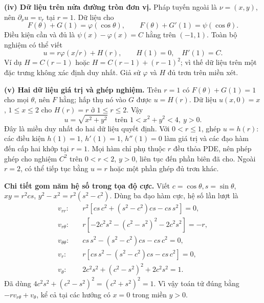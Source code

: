 \textbf{(iv) Dữ liệu trên nửa đường tròn đơn vị.} Pháp tuyến ngoài là $\nu=(x,y)$, nên $\partial_\nu u=v_r$ tại $r=1$. Dữ liệu cho
\[F(\theta)+G(1)=\varphi(\cos\theta),\qquad F(\theta)+G'(1)=\psi(\cos\theta).\]
Điều kiện cần và đủ là $\psi(x)-\varphi(x)=C$ hằng trên $(-1,1)$. Toàn bộ nghiệm có thể viết
\[u=r\varphi(x/r)+H(r),\qquad H(1)=0,\quad H'(1)=C.\]
Ví dụ $H=C(r-1)$ hoặc $H=C(r-1)+(r-1)^2$; vì thế dữ liệu trên một đặc trưng không xác định duy nhất. Giả sử $\varphi$ và $H$ đủ trơn trên miền xét.

\textbf{(v) Hai dữ liệu giá trị và ghép nghiệm.} Trên $r=1$ có $F(\theta)+G(1)=1$ cho mọi $\theta$, nên $F$ hằng; hấp thụ nó vào $G$ được $u=H(r)$. Dữ liệu $u(x,0)=x$, $1\le x\le2$ cho $H(r)=r$ ở $1\le r\le2$. Vậy
\[\boxed{u=\sqrt{x^2+y^2}\quad\text{trên }1<x^2+y^2<4,\ y>0.}\]
Đây là miền duy nhất do hai dữ liệu quyết định. Với $0<r\le1$, ghép $u=h(r)$: các điều kiện $h(1)=1$, $h'(1)=1$, $h''(1)=0$ làm giá trị và các đạo hàm đến cấp hai khớp tại $r=1$. Mọi hàm chỉ phụ thuộc $r$ đều thỏa PDE, nên phép ghép cho nghiệm $C^2$ trên $0<r<2$, $y>0$, liên tục đến phần biên đã cho. Ngoài $r=2$, có thể tiếp tục bằng $u=r$ hoặc một phần ghép đủ trơn khác.

\textbf{Chi tiết gom năm hệ số trong tọa độ cực.} Viết $c=\cos\theta,s=\sin\theta$, $xy=r^2cs$, $y^2-x^2=r^2(s^2-c^2)$. Dùng ba đạo hàm cực, hệ số lần lượt là
\[\begin{aligned}
v_{rr}:&\quad r^2[cs\,c^2+(s^2-c^2)cs-cs\,s^2]=0,\\
v_{r\theta}:&\quad r[-2c^2s^2-(c^2-s^2)^2-2c^2s^2]=-r,\\
v_{\theta\theta}:&\quad cs\,s^2-(s^2-c^2)cs-cs\,c^2=0,\\
v_r:&\quad r[cs\,s^2-(s^2-c^2)cs-cs\,c^2]=0,\\
v_\theta:&\quad 2c^2s^2+(c^2-s^2)^2+2c^2s^2=1.
\end{aligned}\]
Đã dùng $4c^2s^2+(c^2-s^2)^2=(c^2+s^2)^2=1$. Vì vậy toán tử đúng bằng $-rv_{r\theta}+v_\theta$, kể cả tại các hướng có $x=0$ trong miền $y>0$.
